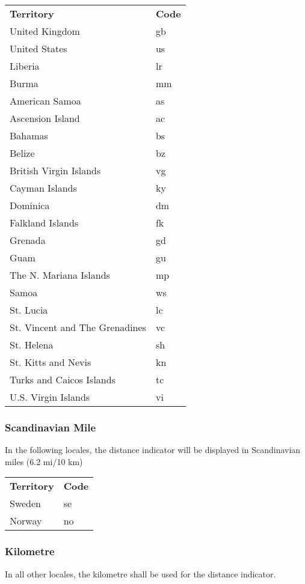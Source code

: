 \documentclass[12pt, a4paper]{article}
\begin{document}
\begin{table}[ht]
\centering
\label{my-label}
\begin{tabular}{ll}
\textbf{Territory} & \textbf{Code}\\
United Kingdom & gb\\
United States & us\\
Liberia & lr\\
Burma & mm\\
American Samoa & as\\
Ascension Island & ac\\
Bahamas & bs\\
Belize & bz\\
British Virgin Islands & vg\\
Cayman Islands & ky\\
Dominica & dm\\
Falkland Islands & fk\\
Grenada & gd\\
Guam & gu\\
The N. Mariana Islands & mp\\
Samoa & ws\\
St. Lucia & lc\\
St. Vincent and The Grenadines & vc\\
St. Helena & sh\\
St. Kitts and Nevis & kn\\
Turks and Caicos Islands & tc\\
U.S. Virgin Islands & vi\\
\end{tabular}
\end{table}

\subsubsection{Scandinavian Mile}
In the following locales, the distance indicator will be displayed in Scandinavian miles (6.2 mi/10 km)
\begin{table}[ht]
\label{my-label}
\centering
\begin{tabular}{ll}
\textbf{Territory} & \textbf{Code}\\
Sweden & se\\
Norway & no\\
\end{tabular}
\end{table}

\subsubsection{Kilometre}
In all other locales, the kilometre shall be used for the distance indicator.
\clearpage
\end{document}
